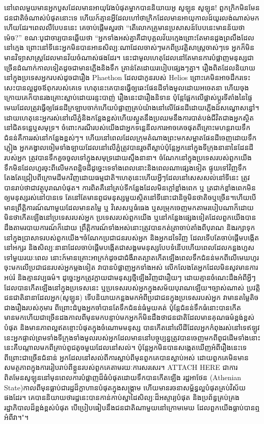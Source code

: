 \documentclass[10pt,twocolumn,letterpaper]{article}
\begin{document}
{នៅពេលមួយមានអ្នកបួសដែលមានអាយុវែងបំផុតម្នាកបាននិយាយ​អូ សូឡុន សូឡុន! ពួកក្រិកមិនមែនជនជាតិចំណាស់បំផុតនោះទេ  ហើយក៍គ្មានអ្វីដែលហៅថាក្រិកដែលមានអាយុកាលដ៍យូរលង់ណាស់មកហើយដែរ។​ពេលលឺបែបននេះ គេចាប់ផ្តើមសួរថា “តើលោកគ្រូមានប្រសាសន៍បែបនេះមានន័យថាម៉េច?” ខណៈបូជាចារ្យបានឆ្លើយថា “អ្នកទាំងអស់គ្នាគឺជាបុគ្គលវ័យក្មេងព្រោះតែមានដួងព្រលឹងដែលនៅក្មេង ព្រោះនៅទីនេះអ្នកមិនបានអានសិល្បៈណាដែលចាស់ៗមកពីប្រវត្តិសាស្ត្រចាស់ៗទេ អ្នកក៏មិនមានវិទ្យាសាស្ត្រដែលមានវ័យចំណាស់ផងដែរ។ នេះជាមូលហេតុដែលនៅតែមានការបំផ្លាញមនុស្សជាច្រើនដំណាក់កាលទៀតដូចជាមានភ្លើងនិងទឹក គ្រាន់តែដោយរបៀបផ្សេងៗគ្នា។ រឿងពិតដែលនិយាយនៅក្នុងប្រទេសអ្នករបស់ដូចជារឿង Phaethon ដែលជាកូនរបស់ Helios ព្រោះគេមិនអាចដឹករទេះសេះបានល្អដូចឪពុករបស់គេទេ ហេតុនេះគេបានធ្វើឲ្យឆេះផែនដីទាំងមូលដោយអចេតនា ហើយចុងក្រោយគេក៏បានរងគ្រោះស្លាប់ដោយរន្ទះបាញ់ រឿងនេះជារឿងនិទាន ប៉ុន្តែផ្អែកលើផ្លាស់ប្តូរទីតាំងនៃផ្ទៃមេឃដែលត្រូវធ្វើឲ្យផែនដីក្រឡាបចាក់​ហើយបំផ្លាញគ្រប់យ៉ាងនៅលើផែនដីដោយភ្លើងដ៍សណ្ធោសន្ធៅ។ ដោយហេតុនេះអ្នករស់នៅលើភ្នំនិងកន្លែងខ្ពស់ហើយស្ងួតនឹងប្រឈមនឹងការបាត់បង់ជីវិតជាងអ្នកស្ថិតនៅជិតទន្លេឬសមុទ្រ។ ចំពោះករណីរបស់យើងជាអ្នកទន្លេនីល​ការអាចគេចផុតពីគ្រោះមហន្តរាយទឹកជំនន់គឺការរស់នៅកន្លែងខ្ពស់ៗ។ ហើយនៅពេលដែលក្រុមតំណាងព្រះមកសម្អាតផែនដីចេញដោយទឹកភ្លៀង អ្នកគង្វាលចៀមទាំងឡាយដែលនៅលើភ្នំត្រូវបានរួចពីស្លាប់​ប៉ុន្តែអ្នកនៅក្នុងទីក្រុងនានានៃដែនដីរបស់អ្នក ត្រូវបានទឹកគួចចូលទៅក្នុងសមុទ្រដោយស្ទឹងនានា។ ចំណែកនៅក្នុងប្រទេសរបស់ពួកយើង ទឹកមិនដែលហូរចុះពីលើមកពន្លិចដីដូច្នេះទេទាំងពេលនោះនិងពេលណាផ្សេងទៀត ផ្ទុយទៅវិញទឹកតែងតែជ្រៀបពីក្រោមដីមកវិញដោយធម្មជាតិ។​ហេតុនេះហើយអ្វីៗដែលនៅសេសសល់នៅទីនេះ ត្រូវបានរាប់ថាជាវត្ថុបុរាណបំផុត។ ការពិតគឺនៅគ្រប់ទីកន្លែងដែលមិនក្តៅខ្លាំងពេក ឬ ត្រជាក់ខ្លាំងពេកមិនឲ្យមនុស្សរស់នៅបានទេ តែនៅតែមានពូជមនុស្សមួយស្ថិតនៅទីនោះជានិច្ចមិនថាតិចឬច្រើន។ហើយបើមានព្រឹត្តិការណ៍ណាមួយដែលមានតម្លៃ ឬ វិសេសឬធំធេង ឬសម្រុកចេញមកតាមរបៀបណាក៏ដោយ មិនថាកើតឡើងនៅប្រទេសរបស់អ្នក ប្រទេសរបស់ពួកយើង ឬនៅកន្លែងផ្សេងទៀតដែលពួកយើងបានដឹងតាមរបាយការណ៍ក៏ដោយ ព្រឹត្តិការណ៍ទាំងអស់នោះត្រូវបានកត់ត្រាចាប់តាំងពីបុរាណ និងរក្សាទុកនៅក្នុងប្រាសាទរបស់ពួកយើង។ចំណែកប្រជាជនរបស់អ្នក និងអ្នកដទៃវិញ ដែលទើបតែចាប់ផ្តើមបង្កើតនៅអក្សរ និងសិល្បៈនានាដែលចាប់ផ្តើមបង្កើតជាសង្គមមនុស្សបែបទំនើប​ហើយពេលដែលកន្លងហួសទៅមួយរយៈពេល នោះក៍មានគ្រោះអាក្រក់ដូចជាជំងឺរាតត្បាតកើតឡើង​ពេលទឹកជំនន់មកពីលើមេឃហូរចុះមកលើប្រជាជនរបស់អ្នកម្តងទៀត វាបានបំផ្លាញអ្នកទាំងអស់ លើកលែងតែអ្នកដែលមិនសូវមានការអប់រំ និងគ្មានវប្បធម៌។ ដូច្នេះអ្នកត្រូវក្លាយជាមនុស្សថ្មីឡើងវិញជារឿយៗ ដោយគ្មានចំណេះដឹងអំពីអ្វីៗដែលបានកើតឡើងនៅក្នុងប្រទេសនេះ ឬប្រទេសរបស់អ្នកក្នុងសម័យបុរាណឡើយ។ច្បាស់ណាស់ ប្រវត្តិជនជាតិនានាដែលអ្នក​(សូឡូន) ទើបនិយាយកន្លងមកអំពីប្រជាជនក្នុងប្រទេសរបស់អ្នក វាមានតម្លៃតិចជាងរឿងរបស់កុមារ ពីព្រោះដំបូងអ្នកចាំបានតែទឹកជំនន់ធំមួយគត់ ប៉ុន្តែជំនន់ទឹកធំនោះបានកើតមានមកហើយជាច្រើនដងកាលពីមុនមក​បន្ទាប់មកអ្នកក៏មិនដឹងថាជនជាតិដែលមានគុណធម៌ខ្ពង់ខ្ពស់បំផុត និងមានភាពល្អឥតខ្ចោះបំផុតក្នុងចំណោមមនុស្ស បានកើតនៅលើដីដែលអ្នកកំពុងរស់នៅទេ​ឥឡូវនេះអ្នកផ្ទាល់ព្រមទាំងទីក្រុងទាំងមូលរបស់អ្នកដែលមាននៅបច្ចុប្បន្នត្រូវបានចេញមកពីពូជដើមទាំងនោះ នេះគឺបណ្តាលមកពីគ្រាប់ពូជតូចមួយដែលនៅសល់។ ប៉ុន្តែអ្នកមិនបានសង្កេតឃើញអំពីរឿងនេះទេ ពីព្រោះជាច្រើនជំនាន់ អ្នកដែលនៅសល់ពីការស្លាប់ពីមុនពួកគេបានស្លាប់អស់ ដោយពួកគេមិនមានសមត្ថភាពក្នុងការរៀបរាប់ពីខ្លួនរបស់ពួកគេតាមរយៈការសរសេរ។ ATTACH HERE ជាការពិតមែនសូឡុន​នៅមុនពេលការបំផ្លាញដ៏ធំបំផុតដោយទឹកបានកើតឡើង រដ្ឋអាថែន (Athenian State)កាលពីមុនធ្លាប់ជារដ្ឋដ៏ក្លាហានបំផុតក្នុងសង្គ្រាម ហើយមានរចនាសម្ព័ន្ធល្អបំផុតគ្រប់វិស័យផងដែរ។ គេបាននិយាយថារដ្ឋនេះបានកាន់កាប់ស្នាដៃសិល្បៈដ៏អស្ចារ្យបំផុត និងប្រព័ន្ធគ្រប់គ្រងរដ្ឋាភិបាលដ៏ខ្ពង់ខ្ពស់បំផុត បើប្រៀបធៀបនឹងជនជាតិណាមួយនៅក្រោមមេឃ ដែលពួកយើងធ្លាប់បានឮអំពីវា។"}។
\end{document}
